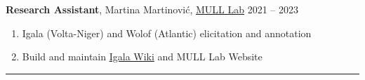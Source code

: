 \documentclass[margin,line]{resume}
\begin{document}
\begin{resume}
	\textbf{Research Assistant}, Martina Martinović, \href{https://mull-lab.org/}{MULL Lab} \hfill 2021 -- 2023
	\begin{enumerate}[-, leftmargin=1em, topsep=2pt]
		\item[] Igala (Volta-Niger) and Wolof (Atlantic) elicitation and annotation
		\item[] Build and maintain \href{https://wiki.mull-lab.org/Igala/}{Igala Wiki} and MULL Lab Website%
	\end{enumerate}%

	\begin{comment}
	\textbf{Full Stack and Mobile Developer}, \href{https://playmind.com/}{PLAYMIND}, Montr\'{e}al \hfill Mar -- Aug 2021
	\begin{enumerate}[-, leftmargin=1em, topsep=2pt]
		\item[] Developed~\href{https://playbox.games/\#home}{
			      PLAYBOX online management portal and Android App}
	\end{enumerate}

	\textbf{Freelance Programmer}, Montr\'{e}al \hfill 2019 -- 2020
	\begin{enumerate}[-, leftmargin=1em, topsep=2pt]
		\item[] Web Development and Python tutoring
	\end{enumerate}

	\textbf{Junior Developer}, \href{https://gls-canada.com/en/dicom/corp/home}{GLS (\textit{fka} Dicom)}, Montr\'{e}al \hfill Jan -- May 2019
	\begin{enumerate}[-, leftmargin=1em, topsep=2pt]
		\item[] Worked on \href{https://gls-canada.com/en/dicom/about-us/news/dicom-launches-smart4-shipping}{smart4 shipping platform} back-end
	\end{enumerate}
	\end{comment}

	\vspace{-0.9em}\rule{\textwidth}{0.4pt}





		\vspace{-0.5em}


\end{resume}
\end{document}
